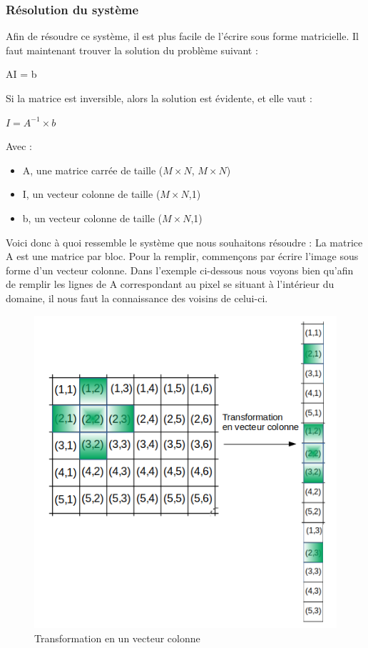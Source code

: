 \subsubsection{Résolution du système}
Afin de résoudre ce système, il est plus facile de l'écrire sous forme matricielle. Il faut maintenant trouver la solution du problème suivant : 
\begin{center}
 AI = b 
\end{center}
Si la matrice est inversible, alors la solution est évidente, et elle vaut : 
\begin{center}
$I = A^{-1}\times b$
\end{center} 
Avec : 
\begin{itemize}
\item A, une matrice carrée de taille ($M\times N$, $M\times N$)
\item I, un vecteur colonne de taille ($M\times N$,1)
\item b, un vecteur colonne de taille ($M\times N$,1)
\end{itemize}
Voici donc à quoi ressemble le système que nous souhaitons résoudre :\newline
La matrice A est une matrice par bloc. Pour la remplir, commençons par écrire l'image sous forme d'un vecteur colonne. Dans l'exemple ci-dessous nous voyons bien qu'afin de remplir les lignes de A correspondant au pixel se situant à l'intérieur du domaine, il nous faut la connaissance des voisins de celui-ci.
\begin{figure}[!h]
\centering
\includegraphics[scale=0.5]{Images/laplacienIJ.png}
\caption{Transformation en un vecteur colonne}
\end{figure}
